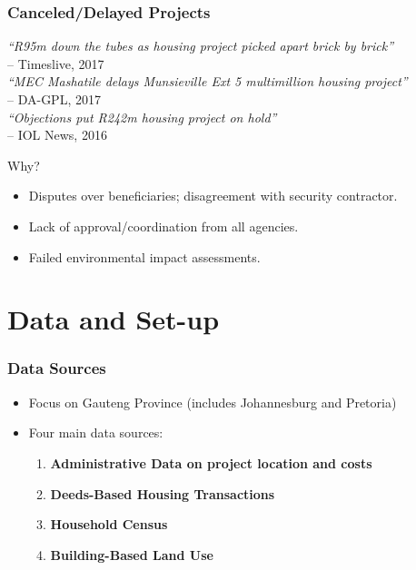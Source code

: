 \documentclass[aspectratio=32]{beamer}
\begin{document}
\begin{frame}
\frametitle{Canceled/Delayed Projects}
\begin{center}

  {\footnotesize
{\it ``R95m down the tubes as housing project picked apart brick by brick''} \\ \hspace{20em}-- Timeslive, 2017 \\[.7em]
{\it ``MEC Mashatile delays Munsieville Ext 5 multimillion housing project''} \\ \hspace{20em}-- DA-GPL, 2017 \\[.7em]
{\it ``Objections put R242m housing project on hold''}\\ \hspace{20em}-- IOL News, 2016 \\[.3em]
}
\end{center}
Why?
\begin{itemize}
\item Disputes over beneficiaries; disagreement with security contractor.
\item Lack of  approval/coordination from all agencies.
\item Failed environmental impact assessments.
\end{itemize}
\end{frame}

\section{Data and Set-up}


\begin{frame}
\frametitle{Data Sources}

\begin{itemize}
  \item Focus on Gauteng Province (includes Johannesburg and Pretoria)

  \vspace{2mm}

  \item<2-> Four main data sources:
  \vspace{2mm}
  \begin{enumerate}
    \item \textbf{Administrative Data on project location and costs} 
    \vspace{2mm}
    \item \textbf{Deeds-Based Housing Transactions} 
    \vspace{2mm}
    \item \textbf{Household Census} 
    \vspace{2mm}
    \item \textbf{Building-Based Land Use}
   
  \end{enumerate}

\end{itemize}

\end{frame}
\end{document}
